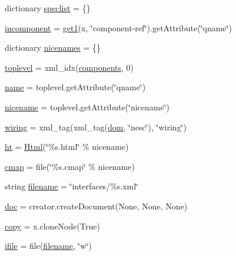 \begin{DoxyCompactItemize}
\item 
dictionary \hyperlink{namespacenesdoc_1_1archive_aa1bbf58fc5d0993fc0969f41f64ccbda}{speclist} = \{\}
\item 
\hyperlink{namespacenesdoc_1_1archive_a872547b2674079bd08bf292f2ae65ab7}{incomponent} = \hyperlink{namespacenesdoc_1_1archive_a0e1ef9fd5092eb3e085b0a8024c835a7}{get1}(x, \char`\"{}component-\/ref\char`\"{}).get\+Attribute(\char`\"{}qname\char`\"{})
\item 
dictionary \hyperlink{namespacenesdoc_1_1archive_a365ae62f9da8711f1b4d985793b9a517}{nicenames} = \{\}
\item 
\hyperlink{namespacenesdoc_1_1archive_af8d43aad68a2aa804f3cdb3fd916d6f4}{toplevel} = xml\+\_\+idx(\hyperlink{namespacenesdoc_1_1archive_ae7a2b64dda9dc7c81933106dcb0913e9}{components}, 0)
\item 
\hyperlink{namespacenesdoc_1_1archive_ac1e3ca5ea254f2d542c19d1fd474e6d5}{name} = toplevel.\+get\+Attribute(\char`\"{}qname\char`\"{})
\item 
\hyperlink{namespacenesdoc_1_1archive_a099b2ce375913f82d15ca54759c823f5}{nicename} = toplevel.\+get\+Attribute(\char`\"{}nicename\char`\"{})
\item 
\hyperlink{namespacenesdoc_1_1archive_a1160552e7edb290ebe1d5d0341df787a}{wiring} = xml\+\_\+tag(xml\+\_\+tag(\hyperlink{namespacenesdoc_1_1archive_a9447d2728dbdda43111396d792a51c52}{dom}, \char`\"{}nesc\char`\"{}), \char`\"{}wiring\char`\"{})
\item 
\hyperlink{namespacenesdoc_1_1archive_aa1b54f5d388a3d329d1e56d9ff2b8194}{ht} = \hyperlink{classnesdoc_1_1html_1_1_html}{Html}(\char`\"{}\%s.\+html\char`\"{} \% nicename)
\item 
\hyperlink{namespacenesdoc_1_1archive_aa49c8c4289afd05be16eac14cfa8d146}{cmap} = file(\char`\"{}\%s.\+cmap\char`\"{} \% nicename)
\item 
string \hyperlink{namespacenesdoc_1_1archive_a3bd3639fb04d21af62d464e2ace3d6d5}{filename} = \char`\"{}interfaces/\%s.\+xml\char`\"{}
\item 
\hyperlink{namespacenesdoc_1_1archive_ad9eceac7bc9fbf7cc8ae91ee16f5b1bc}{doc} = creator.\+create\+Document(None, None, None)
\item 
\hyperlink{namespacenesdoc_1_1archive_a277234d1849fb06e8d6df199f2445812}{copy} = x.\+clone\+Node(True)
\item 
\hyperlink{namespacenesdoc_1_1archive_a82e3fa6d86d02e9d5f524f2508bb358f}{ifile} = file(\hyperlink{namespacenesdoc_1_1archive_a3bd3639fb04d21af62d464e2ace3d6d5}{filename}, \char`\"{}w\char`\"{})

\end{DoxyCompactItemize}
